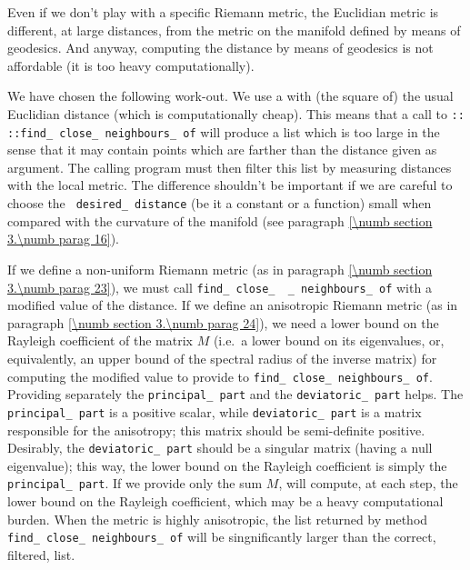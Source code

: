 Even if we don't play with a specific Riemann metric, the Euclidian metric is different,
at large distances, from the metric on the manifold defined by means of geodesics.
And anyway, computing the distance by means of geodesics is not affordable (it is too heavy
computationally).

We have chosen the following work-out.
We use a {\small\tt{}} with (the square of) the usual Euclidian distance (which is
computationally cheap).
This means that a call to {\small\tt{}:: ::find\_\,close\_\,neighbours\_\,of}
will produce a list which is too large in the sense that it may contain points which are
farther than the distance given as argument.
The calling program must then filter this list by measuring distances with the local metric.
The difference shouldn't be important if we are careful to choose the {\small\tt
desired\_\,distance} (be it a constant or a function) small when compared with the curvature
of the manifold (see paragraph \ref{\numb section 3.\numb parag 16}).

If we define a non-uniform Riemann metric
(as in paragraph \ref{\numb section 3.\numb parag 23}),
we must call {\small\tt find\_\,close\_\, \_\,neighbours\_\,of} with a modified value of the
distance.
If we define an anisotropic Riemann metric
(as in paragraph \ref{\numb section 3.\numb parag 24}),
we need a lower bound on the Rayleigh coefficient of the matrix $M$ (i.e.\ a lower bound
on its eigenvalues, or, equivalently, an upper bound of the spectral radius of the inverse
matrix) for computing the modified value to provide to {\small\tt find\_\,close\_\,neighbours\_\,of}.
Providing separately the {\small\tt principal\_\,part} and the {\small\tt deviatoric\_\,part} helps.
The {\small\tt principal\_\,part} is a positive scalar, while {\small\tt deviatoric\_\,part} is
a matrix responsible for the anisotropy; this matrix should be semi-definite positive.
Desirably, the {\small\tt deviatoric\_\,part} should be a singular matrix (having a null eigenvalue);
this way, the lower bound on the Rayleigh coefficient is simply the {\small\tt principal\_\,part}.
If we provide only the sum $M$, {\maniFEM} will compute, at each step, the lower bound on the
Rayleigh coefficient, which may be a heavy computational burden.
When the metric is highly anisotropic, the list returned by method
{\small\tt find\_\,close\_\,neighbours\_\,of} will be singnificantly larger than the correct, filtered, list.

